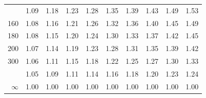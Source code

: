 \documentclass[10pt]{article}
\begin{document}
\begin{longtable}{@{}r!{\vrule width 0.8pt\hspace{0.55em}}rrrrrrrrr@{}}
 & 1.09 & 1.18 & 1.23 & 1.28 & 1.35 & 1.39 & 1.43 & 1.49 & 1.53 \\
160 & 1.08 & 1.16 & 1.21 & 1.26 & 1.32 & 1.36 & 1.40 & 1.45 & 1.49 \\
180 & 1.08 & 1.15 & 1.20 & 1.24 & 1.30 & 1.33 & 1.37 & 1.42 & 1.45 \\
200 & 1.07 & 1.14 & 1.19 & 1.23 & 1.28 & 1.31 & 1.35 & 1.39 & 1.42 \\
300 & 1.06 & 1.11 & 1.15 & 1.18 & 1.22 & 1.25 & 1.27 & 1.30 & 1.33 \\
 & 1.05 & 1.09 & 1.11 & 1.14 & 1.16 & 1.18 & 1.20 & 1.23 & 1.24 \\
$\infty$ & 1.00 & 1.00 & 1.00 & 1.00 & 1.00 & 1.00 & 1.00 & 1.00 & 1.00 \\
\end{longtable}
\end{document}
